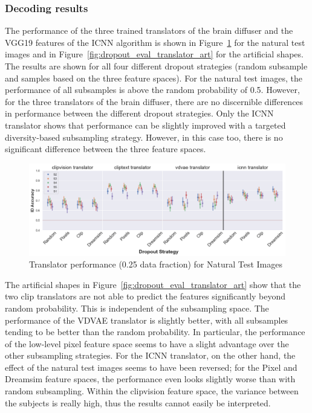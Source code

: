 \subsubsection{Decoding results}
The performance of the three trained translators of the brain diffuser and the VGG19 features of the ICNN algorithm is shown in Figure~\ref{fig:dropout_eval_translator_test} for the natural test images and in Figure~\ref{fig:dropout_eval_translator_art} for the artificial shapes. The results are shown for all four different dropout strategies (random subsample and samples based on the three feature spaces). For the natural test images, the performance of all subsamples is above the random probability of 0.5. However, for the three translators of the brain diffuser, there are no discernible differences in performance between the different dropout strategies. Only the ICNN translator shows that performance can be slightly improved with a targeted diversity-based subsampling strategy. However, in this case too, there is no significant difference between the three feature spaces.

\begin{figure}[ht]
  \centering
  \includegraphics[width=1\textwidth]{plots/dropout_eval_translator_test.png}
  \caption{Translator performance (0.25 data fraction) for Natural Test Images}\label{fig:dropout_eval_translator_test}
\end{figure}

The artificial shapes in Figure~\ref{fig:dropout_eval_translator_art} show that the two clip translators are not able to predict the features significantly beyond random probability. This is independent of the subsampling space. The performance of the VDVAE translator is slightly better, with all subsamples tending to be better than the random probability. In particular, the performance of the low-level pixel feature space seems to have a slight advantage over the other subsampling strategies. For the ICNN translator, on the other hand, the effect of the natural test images seems to have been reversed; for the Pixel and Dreamsim feature spaces, the performance even looks slightly worse than with random subsampling. Within the clipvision feature space, the variance between the subjects is really high, thus the results cannot easily be interpreted.

